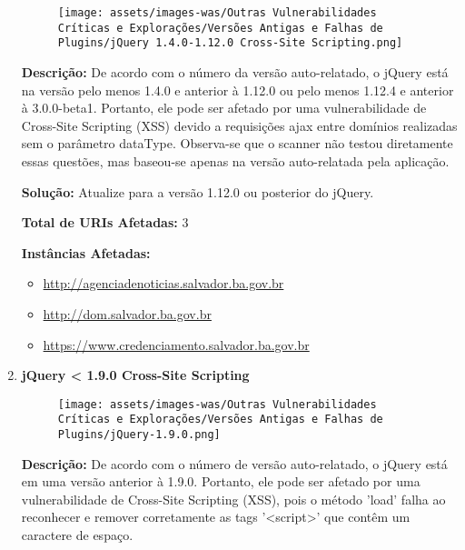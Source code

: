 \documentclass[a4paper,12pt]{article}
\begin{document}
\begin{enumerate}
                        \begin{figure}[h!]
                        \centering
                        \texttt{[image: assets/images-was/Outras Vulnerabilidades Críticas e Explorações/Versões Antigas e Falhas de Plugins/jQuery 1.4.0-1.12.0 Cross-Site Scripting.png]}
                        \end{figure}
                        \FloatBarrier
                        \textbf{Descrição:} De acordo com o número da versão auto-relatado, o jQuery está na versão pelo menos 1.4.0 e anterior à 1.12.0 ou pelo menos 1.12.4 e anterior à 3.0.0-beta1. Portanto, ele pode ser afetado por uma vulnerabilidade de Cross-Site Scripting (XSS) devido a requisições ajax entre domínios realizadas sem o parâmetro dataType. Observa-se que o scanner não testou diretamente essas questões, mas baseou-se apenas na versão auto-relatada pela aplicação.

\textbf{Solução:} Atualize para a versão 1.12.0 ou posterior do jQuery.

\textbf{Total de URIs Afetadas:} 3

\textbf{Instâncias Afetadas:}
\begin{itemize}
    \item \url{http://agenciadenoticias.salvador.ba.gov.br}
    \item \url{http://dom.salvador.ba.gov.br}
    \item \url{https://www.credenciamento.salvador.ba.gov.br}
\end{itemize}

\item \textbf{jQuery < 1.9.0 Cross-Site Scripting}

                        \begin{figure}[h!]
                        \centering
                        \texttt{[image: assets/images-was/Outras Vulnerabilidades Críticas e Explorações/Versões Antigas e Falhas de Plugins/jQuery-1.9.0.png]}
                        \end{figure}
                        \FloatBarrier
                        \textbf{Descrição:} De acordo com o número de versão auto-relatado, o jQuery está em uma versão anterior à 1.9.0. Portanto, ele pode ser afetado por uma vulnerabilidade de Cross-Site Scripting (XSS), pois o método 'load' falha ao reconhecer e remover corretamente as tags '<script>' que contêm um caractere de espaço.


\end{enumerate}
\end{document}
